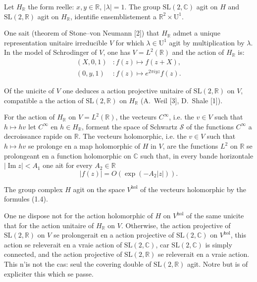 \documentclass[12pt,a4paper]{article}
\theoremstyle{plain}
\theoremstyle{definition}
\theoremstyle{remark}
\DeclareMathOperator{\Impart}{Im}
\begin{document}
Let $H_\mathbb{R}$ the form reelle: $x, y \in \mathbb{R}$, $|\lambda| = 1$. The group $\mathrm{SL}(2, \mathbb{C})$ agit on $H$ and $\mathrm{SL}(2, \mathbb{R})$ agit on $H_\mathbb{R}$, identifie ensemblistement a $\mathbb{R}^2 \times \mathrm{U}^1$.

One sait (theorem of Stone--von Neumann [2]) that $H_\mathbb{R}$ admet a unique representation unitaire irreducible $V$ for which $\lambda \in \mathrm{U}^1$ agit by multiplication by $\lambda$. In the model of Schrodinger of $V$, one has $V = L^2(\mathbb{R})$ and the action of $H_\mathbb{R}$ is:
\begin{align*}
(X, 0, 1) &\colon f(z) \mapsto f(z + X), \\
(0, y, 1) &\colon f(z) \mapsto e^{2\pi iyz}f(z).\tag{1.4}
\end{align*}

Of the unicite of $V$ one deduces a action projective unitaire of $\mathrm{SL}(2, \mathbb{R})$ on $V$, compatible a the action of $\mathrm{SL}(2, \mathbb{R})$ on $H_\mathbb{R}$ (A.~Weil [3], D.~Shale [1]).

For the action of $H_\mathbb{R}$ on $V = L^2(\mathbb{R})$, the vecteurs $C^\infty$, i.e. the $v \in V$ such that $h \mapsto hv$ let $C^\infty$ en $h \in H_\mathbb{R}$, forment the space of Schwartz $\mathcal{S}$ of the functions $C^\infty$ a decroissance rapide on $\mathbb{R}$. The vecteurs holomorphic, i.e. the $v \in V$ such that $h \mapsto hv$ se prolonge en a map holomorphic of $H$ in $V$, are the functions $L^2$ on $\mathbb{R}$ se prolongeant en a function holomorphic on $\mathbb{C}$ such that, in every bande horizontale $|\Impart z| < A_1$ one ait for every $A_2 \in \mathbb{R}$
\[|f(z)| = O(\exp(-A_2|z|)).\]

The group complex $H$ agit on the space $V^{\mathrm{hol}}$ of the vecteurs holomorphic by the formules (1.4).

One ne dispose not for the action holomorphic of $H$ on $V^{\mathrm{hol}}$ of the same unicite that for the action unitaire of $H_\mathbb{R}$ on $V$. Otherwise, the action projective of $\mathrm{SL}(2, \mathbb{R})$ on $V$ se prolongerait en a action projective of $\mathrm{SL}(2, \mathbb{C})$ on $V^{\mathrm{hol}}$, this action se releverait en a vraie action of $\mathrm{SL}(2, \mathbb{C})$, car $\mathrm{SL}(2, \mathbb{C})$ is simply connected, and the action projective of $\mathrm{SL}(2, \mathbb{R})$ se releverait en a vraie action. This n'is not the cas: seul the covering double of $\mathrm{SL}(2, \mathbb{R})$ agit. Notre but is of expliciter this which se passe.
\end{document}
